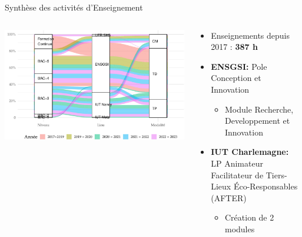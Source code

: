 \documentclass[
  11pt,
  ignorenonframetext,
  aspectratio=169,
  c]{beamer}
\providecommand{\tightlist}{%
  \setlength{\itemsep}{0pt}\setlength{\parskip}{0pt}}\usepackage{longtable,booktabs,array}
\begin{document}
\begin{frame}{Synthèse des activités d'Enseignement}
\protect\hypertarget{synthuxe8se-des-activituxe9s-denseignement}{}
\begin{columns}[T]
\begin{column}[c]{0.5\textwidth}
\includegraphics{figures/fig-sankey-1.pdf}
\end{column}

\begin{column}[c]{0.5\textwidth}
\small

\begin{itemize}
\item
  Enseignements depuis 2017 : \textbf{387 h}
\item
  \textbf{ENSGSI:} Pole Conception et Innovation

  \begin{itemize}
  \tightlist
  \item
    Module Recherche, Developpement et Innovation
  \end{itemize}
\item
  \textbf{IUT Charlemagne:} LP Animateur Facilitateur de Tiers-Lieux
  Éco-Responsables (AFTER)

  \begin{itemize}
  \tightlist
  \item
    Création de 2 modules
  \end{itemize}
\end{itemize}
\end{column}
\end{columns}
\end{frame}
\end{document}

